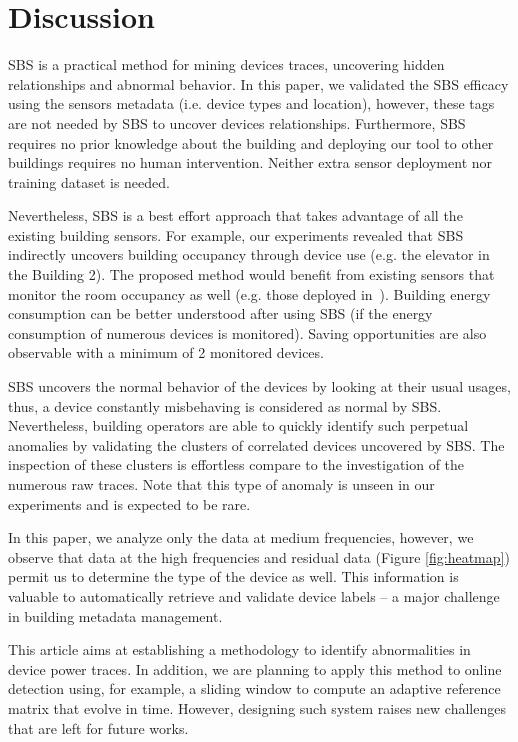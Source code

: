 \section{Discussion}
SBS is a practical method for mining devices traces, uncovering hidden relationships and abnormal behavior. 
In this paper, we validated the SBS efficacy using the sensors metadata (i.e. device types and location), however, these 
tags are not needed by SBS to uncover devices relationships.
Furthermore, SBS requires no prior knowledge about the building and deploying our tool to other buildings requires no human intervention.
Neither extra sensor deployment nor training dataset is needed. 

Nevertheless, SBS is a best effort approach that takes advantage of all the existing building sensors.
For example, our experiments revealed that SBS indirectly uncovers building occupancy through device use (e.g. the elevator in the Building 2). 
The proposed method would benefit from existing sensors that monitor the room occupancy as well (e.g. those deployed in~\cite{agarwal:ipsn2011,erickson:ipsn2011}).  %
Building energy consumption can be better understood after using SBS (if the energy consumption of numerous devices is monitored).  
Saving opportunities are also observable with a minimum of 2 monitored devices.

SBS uncovers the normal behavior of the devices by looking at their usual usages, thus, a device constantly misbehaving is considered as normal by SBS.
Nevertheless, building operators are able to quickly identify such perpetual anomalies by validating the clusters of correlated devices uncovered by SBS.
The inspection of these clusters is effortless compare to the investigation of the numerous raw traces.
Note that this type of anomaly is unseen in our experiments and is expected to be rare.

In this paper, we analyze only the data at medium frequencies, however, we observe that data at the high frequencies and residual data (Figure \ref{fig:heatmap}) permit us to determine the type of the  device as well.
This information is valuable to automatically retrieve and validate device labels -- a major challenge in building metadata
management.

This article aims at establishing a methodology to identify abnormalities in device power traces.
In addition, we are planning to apply this method to online detection using, for example, a sliding window to compute an adaptive reference matrix that evolve in time.
However, designing such system raises new challenges that are left for future works.

% 
% 
